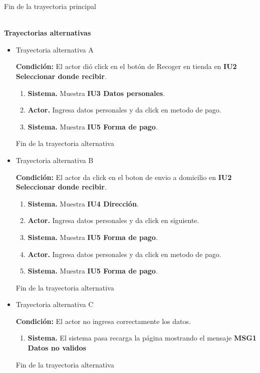 Fin de la trayectoria principal

\noindent \textbf{\\Trayectorias alternativas}

\begin{itemize}
	
	\item \hypertarget{CU4:TAA}{Trayectoria alternativa A}
	
	\noindent \textbf{Condición:} El actor dió click en el botón de Recoger en tienda en \textbf{IU2 Seleccionar donde recibir}.
	
	\begin{enumerate}
		\item \textbf{Sistema.} Muestra \textbf{IU3 Datos personales}.
		\item \textbf{Actor.} Ingresa datos personales y da click en metodo de pago.
		\item \textbf{Sistema.} Muestra \textbf{IU5 Forma de pago}.
	\end{enumerate}
	
	Fin de la trayectoria alternativa
	
	\item \hypertarget{CU1:TAB}{Trayectoria alternativa B}
	
	\noindent \textbf{Condición:} El actor da click en el boton de envio a domicilio en \textbf{IU2 Seleccionar donde recibir}.

\begin{enumerate}
	\item \textbf{Sistema.} Muestra \textbf{IU4 Dirección}.
	\item \textbf{Actor.} Ingresa datos personales y da click en siguiente.
	\item \textbf{Sistema.} Muestra \textbf{IU5 Forma de pago}.
	\item \textbf{Actor.} Ingresa datos personales y da click en metodo de pago.
	\item \textbf{Sistema.} Muestra \textbf{IU5 Forma de pago}.
\end{enumerate}

	Fin de la trayectoria alternativa
	
	\item \hypertarget{CU1:TAC}{Trayectoria alternativa C}
	
	\noindent \textbf{Condición:} El actor no ingresa correctamente los datos.
	
	\begin{enumerate}
		
		\item \textbf{Sistema.} El sistema pasa recarga la página mostrando el mensaje \textbf{MSG1 Datos no validos}
		
	\end{enumerate}
	
	Fin de la trayectoria alternativa
\end{itemize}	
	

